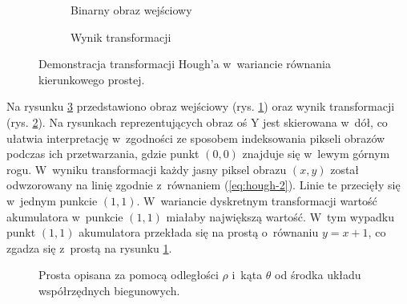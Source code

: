 \begin{figure}
    \centering
    \begin{subfigure}{0.45\textwidth}
        \centering
        
    \caption{Binarny obraz wejściowy}\label{fig:houghSlopeA}
    \end{subfigure}\hfill
    \begin{subfigure}{0.45\textwidth}
        \centering
        
    \caption{Wynik transformacji}\label{fig:houghSlopeB}
    \end{subfigure}

    \caption{Demonstracja transformacji Hough'a w~wariancie równania kierunkowego prostej.}
    \label{fig:houghSlope}
\end{figure}
\hspace{1cm}


Na rysunku \ref{fig:houghSlope} przedstawiono obraz wejściowy (rys. \ref{fig:houghSlopeA}) oraz wynik transformacji (rys. \ref{fig:houghSlopeB}). Na rysunkach reprezentujących obraz oś Y jest skierowana w~dół, co ułatwia interpretację w~zgodności ze sposobem indeksowania pikseli obrazów podczas ich przetwarzania, gdzie punkt $(0,0)$ znajduje się w~lewym górnym rogu. W~wyniku transformacji każdy jasny piksel obrazu $(x, y)$ został odwzorowany na linię zgodnie z~równaniem (\ref{eq:hough-2}). Linie te przecięły się w~jednym punkcie $(1,1)$. W~wariancie dyskretnym transformacji wartość akumulatora w~punkcie $(1,1)$ miałaby największą wartość. W~tym wypadku punkt $(1,1)$ akumulatora przekłada się na prostą o~równaniu $y = x+1$, co zgadza się z~prostą na rysunku \ref{fig:houghSlopeA}.
\begin{wrapfigure}{r}{7cm}
    \centering
    
    \caption{Prosta opisana za pomocą odległości $\rho$ i~kąta $\theta$ od środka układu współrzędnych biegunowych.}
    \label{fig:houghLineAngle}
\end{wrapfigure}




